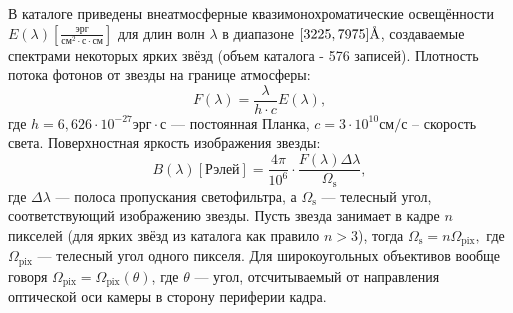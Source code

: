 \documentclass[12pt,a4paper]{article}
\newcommand{\angstrom}{\textup{\AA}}
\begin{document}
В каталоге \cite{Kharitonov1978} приведены внеатмосферные квазимонохроматические освещённости $E(\lambda) [\frac{\text{эрг}}{\text{см}^2 \cdot \text{с} \cdot \text{см}}]$ для длин волн $\lambda$ в диапазоне $[3225,7975]\angstrom$, создаваемые спектрами некоторых ярких звёзд (объем каталога - 576 записей). Плотность потока фотонов от звезды на границе атмосферы:
\begin{equation}\label{eq:eq9}
F(\lambda)=\frac{\lambda}{h \cdot c} E(\lambda),
\end{equation}
где $h=6,626\cdot 10^{-27} \text{эрг}\cdot \text{с}$ --- постоянная Планка, $c =  3 \cdot 10^{10} \text{см}/\text{с}$ -- скорость света. Поверхностная яркость изображения звезды:
\begin{equation}\label{eq:eq10}
B(\lambda) [\text{Рэлей}] = \frac {4\pi}{10^6} \cdot \frac{F(\lambda) \Delta \lambda} {\Omega_\text{s}},
\end{equation}
где $\Delta \lambda$ --- полоса пропускания светофильтра, а $\Omega_\text{s}$ --- телесный угол, соответствующий изображению звезды. Пусть звезда занимает в кадре $n$ пикселей (для ярких звёзд из каталога \cite{Kharitonov1978} как правило $n>3$), тогда $\Omega_\text{s}=n\Omega_{\text{pix}},$ где $\Omega_{\text{pix}}$ --- телесный угол одного пикселя. Для широкоугольных объективов вообще говоря $\Omega_{\text{pix}}=\Omega_{\text{pix}}(\theta)$, где $\theta$ --- угол, отсчитываемый от направления оптической оси камеры в сторону периферии кадра. 
\end{document}
